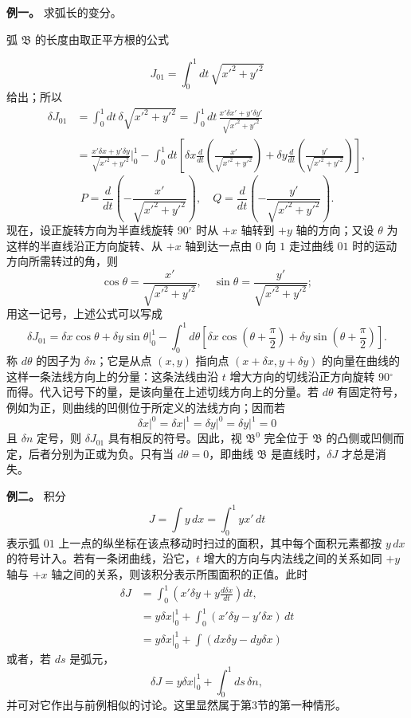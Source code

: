 \documentclass[11pt,a4paper,leqno]{article}
\begin{document}
\medskip
\noindent\textbf{例一。} 求弧长的变分。

弧 \(\mathfrak B\) 的长度由取正平方根的公式

\[
J_{01}=\int_0^1dt\,\sqrt{x'^2+y'^2}
\]
给出；所以
\[
\begin{aligned}
\delta J_{01}
&=\int_0^1dt\,\delta\sqrt{x'^2+y'^2}
 =\int_0^1dt\,\frac{x'\delta x'+y'\delta y'}{\sqrt{x'^2+y'^2}}\\
&=\frac{x'\delta x+y'\delta y}{\sqrt{x'^2+y'^2}}\bigg|_0^1
-\int_0^1dt\left[\delta x\frac{d}{dt}\left(\frac{x'}{\sqrt{x'^2+y'^2}}\right)+\delta y\frac{d}{dt}\left(\frac{y'}{\sqrt{x'^2+y'^2}}\right)\right],
\end{aligned}
\]
\[
P=\frac{d}{dt}\left(-\frac{x'}{\sqrt{x'^2+y'^2}}\right),\quad
Q=\frac{d}{dt}\left(-\frac{y'}{\sqrt{x'^2+y'^2}}\right).
\]
现在，设正旋转方向为半直线旋转 90\(^{\circ}\) 时从 $+x$ 轴转到 $+y$ 轴的方向；又设 $\theta$ 为这样的半直线沿正方向旋转、从 $+x$ 轴到达一点由 $0$ 向 $1$ 走过曲线 $01$ 时的运动方向所需转过的角，则
\[
\cos\theta=\frac{x'}{\sqrt{x'^2+y'^2}},\quad \sin\theta=\frac{y'}{\sqrt{x'^2+y'^2}};
\]
用这一记号，上述公式可以写成
\[
\delta J_{01}=\delta x\cos\theta+\delta y\sin\theta\bigg|_0^1
-\int_0^1d\theta\left[\delta x\cos\left(\theta+\frac{\pi}{2}\right)+\delta y\sin\left(\theta+\frac{\pi}{2}\right)\right].
\]
称 $d\theta$ 的因子为 $\delta n$；它是从点 $(x,y)$ 指向点 $(x+\delta x,y+\delta y)$ 的向量在曲线的这样一条法线方向上的分量：这条法线由沿 $t$ 增大方向的切线沿正方向旋转 90\(^{\circ}\) 而得。代入记号下的量，是该向量在上述切线方向上的分量。若 $d\theta$ 有固定符号，例如为正，则曲线的凹侧位于所定义的法线方向；因而若
\[
\delta x\big|^0=\delta x\big|^1=\delta y\big|^0=\delta y\big|^1=0
\]
且 $\delta n$ 定号，则 $\delta J_{01}$ 具有相反的符号。因此，视 $\mathfrak B^0$ 完全位于 $\mathfrak B$ 的凸侧或凹侧而定，后者分别为正或为负。只有当 $d\theta=0$，即曲线 $\mathfrak B$ 是直线时，$\delta J$ 才总是消失。

\medskip
\noindent\textbf{例二。} 积分
\[
J=\int y\,dx=\int_0^1yx'\,dt
\]
表示弧 $01$ 上一点的纵坐标在该点移动时扫过的面积，其中每个面积元素都按 $y\,dx$ 的符号计入。若有一条闭曲线，沿它，$t$ 增大的方向与内法线之间的关系如同 $+y$ 轴与 $+x$ 轴之间的关系，则该积分表示所围面积的正值。此时
\[
\begin{aligned}
\delta J
&=\int_0^1\left(x'\delta y+y\frac{d\delta x}{dt}\right)dt,\\
&=y\delta x\bigg|_0^1+\int_0^1(x'\delta y-y'\delta x)\,dt\\
&=y\delta x\bigg|_0^1+\int(dx\delta y-dy\delta x)
\end{aligned}
\]
或者，若 \(ds\) 是弧元，
\[
\delta J=y\delta x\bigg|_0^1+\int_0^1ds\,\delta n,
\]
并可对它作出与前例相似的讨论。这里显然属于第3节的第一种情形。
\end{document}
